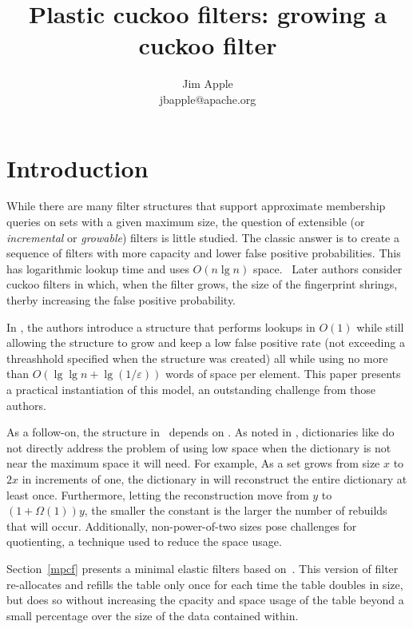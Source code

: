 \documentclass[letterpaper, 11pt]{article}
\begin{document}
\title{Plastic cuckoo filters: growing a cuckoo filter}
\author{Jim Apple \\
  jbapple@apache.org}
\maketitle

\section{Introduction}
While there are many filter structures that support approximate membership queries on sets with a given maximum size, the question of extensible (or {\em incremental} or {\em growable}) filters is little studied.
The classic answer is to create a sequence of filters with more capacity and lower false positive probabilities.
This has logarithmic lookup time and uses $O(n \lg n)$ space.~\cite{psw}
Later authors consider cuckoo filters in which, when the filter grows, the size of the fingerprint shrings, therby increasing the false positive probability.~\cite{logarithm}

In \cite{psw}, the authors introduce a structure that performs lookups in $O(1)$ while still allowing the structure to grow and keep a low false positive rate (not exceeding a threashhold specified when the structure was created) all while using no more than $O(\lg \lg n + \lg (1/\varepsilon))$ words of space per element.
This paper presents a practical instantiation of this model, an outstanding challenge from those authors.

As a follow-on, the structure in~\cite{psw} depends on \cite{succinct}.
As noted in \cite{dysect}, dictionaries like \cite{succinct} do not directly address the problem of using low space when the dictionary is not near the maximum space it will need.
For example, As a set grows from size $x$ to $2x$ in increments of one, the dictionary in \cite{succinct} will reconstruct the entire dictionary at least once.
Furthermore, letting the reconstruction move from $y$ to $(1 + \Omega(1))y$, the smaller the constant is the larger the number of rebuilds that will occur.
Additionally, non-power-of-two sizes pose challenges for quotienting, a technique used to reduce the space usage.~\cite{change-your-base, cleary-quotient}

Section~\ref{mpcf} presents a minimal elastic filters based on~\cite{dysect}.
This version of filter re-allocates and refills the table only once for each time the table doubles in size, but does so without increasing the cpacity and space usage of the table beyond a small percentage over the size of the data contained within.
\end{document}
